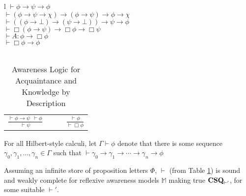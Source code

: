

\begin{table}[h]
\begin{centering}
  \begin{tabular}{l}
    $\vdash \phi \rightarrow \psi \rightarrow \phi$\\
    $\vdash (\phi \rightarrow \psi \rightarrow \chi) \rightarrow (\phi
    \rightarrow \psi) \rightarrow \phi \rightarrow \chi$\\
    $\vdash ((\phi \rightarrow \bot) \rightarrow (\psi \rightarrow \bot))
    \rightarrow \psi \rightarrow \phi$\\
    $\vdash \Box(\phi \rightarrow \psi) \rightarrow \Box \phi \rightarrow \Box
    \psi$\\
    $\vdash A : \phi \rightarrow \Box \phi$\\
    $\vdash \Box \phi \rightarrow \phi$\\
    \\
    \begin{tabular}{lll}
      $\displaystyle \frac{\vdash \phi \rightarrow \psi \ \  \vdash \phi}{\vdash
      \psi}$ & {\ \ } & $\displaystyle \frac{\vdash \phi}{\vdash \Box \phi}$
    \end{tabular}
  \end{tabular}
  \caption{\label{logic0}Awareness Logic for Acquaintance and
    Knowledge by Description}
\end{centering}
\end{table}

\begin{notation}
For all Hilbert-style calculi, let $\Gamma \vdash \phi$
denote that there is some sequence
$\gamma_0,\gamma_1,\ldots,\gamma_n\in\Gamma$ such that $\vdash
\gamma_0 \to \gamma_1 \to \cdots \to \gamma_n \to \phi$
\end{notation}

\begin{theorem}
  \label{completeness0}Assuming an infinite store of proposition letters
  $\Phi$, $\vdash$ (from Table \ref{logic0}) is sound and weakly complete for
  reflexive awareness models $\mathbb{M}$ making true
  $\text{{\bfseries{CSQ}}}_{\vdash'}$, for some suitable $\vdash'$.
\end{theorem}



